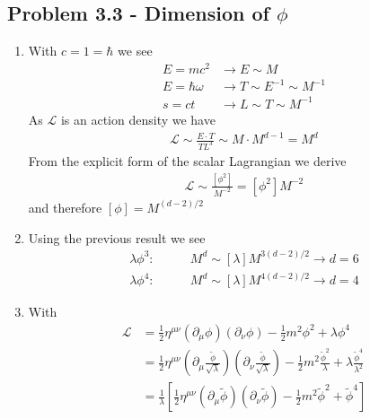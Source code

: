 \documentclass[../main.tex]{subfiles}
\begin{document}
\subsection{Problem 3.3 - Dimension of \texorpdfstring{$\phi$}{TEXT}}
\begin{enumerate}
    \item With $c=1=\hbar$ we see
    \begin{align}
        E=mc^2        &\rightarrow E\sim M\\
        E=\hbar\omega &\rightarrow T\sim E^{-1}\sim M^{-1}\\
        s=ct          &\rightarrow L\sim T\sim M^{-1}
    \end{align}
    As $\mathscr{L}$ is an action density we have
    \begin{align}
        \mathscr{L}\sim \frac{E\cdot T}{TL^3}\sim M\cdot M^{d-1}=M^d
    \end{align}
    From the explicit form of the scalar Lagrangian we derive
    \begin{align}
        \mathscr{L}\sim \frac{[\phi^2]}{M^{-2}}=[\phi^2]M^{-2}
    \end{align}
    and therefore $[\phi]=M^{(d-2)/2}$
    
    \item Using the previous result we see
    \begin{align}
        \lambda\phi^3: &\qquad M^d \sim [\lambda] M^{3(d-2)/2}\rightarrow d=6\\
        \lambda\phi^4: &\qquad M^d \sim [\lambda] M^{4(d-2)/2}\rightarrow d=4
    \end{align}
    
    \item With
    \begin{align}
        \mathscr{L}
        &=\frac{1}{2}\eta^{\mu\nu}(\partial_\mu\phi)(\partial_\nu\phi)-\frac{1}{2}m^2\phi^2+\lambda\phi^4\\
        &=\frac{1}{2}\eta^{\mu\nu}\left(\partial_\mu\frac{\tilde\phi}{\sqrt{\lambda}}\right)\left(\partial_\nu\frac{\tilde\phi}{\sqrt{\lambda}}\right)-\frac{1}{2}m^2\frac{\tilde\phi^2}{\lambda}+\lambda\frac{\tilde\phi^4}{\lambda^2}\\
        &=\frac{1}{\lambda}\left[\frac{1}{2}\eta^{\mu\nu}(\partial_\mu\tilde\phi)(\partial_\nu\tilde\phi)-\frac{1}{2}m^2\tilde\phi^2+\tilde\phi^4\right]
    \end{align}
\end{enumerate}
\end{document}
